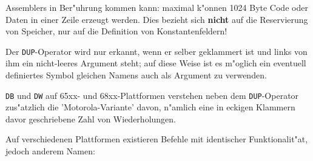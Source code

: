 \documentclass[12pt,a4paper,twoside]{report}
\newcommand{\bb}[1]{{\bf #1}}
\newcommand{\tty}[1]{{\tt #1}}
\begin{document}
Assemblers in Ber"uhrung kommen kann: maximal k"onnen 1024 Byte Code
oder Daten in einer Zeile erzeugt werden.  Dies bezieht sich \bb{nicht}
auf die Reservierung von Speicher, nur auf die Definition von
Konstantenfeldern!
\par
Der \tty{DUP}-Operator wird nur erkannt, wenn er selber geklammert ist
und links von ihm ein nicht-leeres Argument steht; auf diese Weise ist es
m"oglich ein eventuell definiertes Symbol gleichen Namens auch als Argument
zu verwenden.
\par
\tty{DB} und \tty{DW} auf 65xx- und 68xx-Plattformen verstehen neben
dem \tty{DUP}-Operator zus"atzlich die 'Motorola-Variante' davon,
n"amlich eine in eckigen Klammern davor geschriebene Zahl von
Wiederholungen.
\par
Auf verschiedenen Plattformen existieren Befehle mit identischer
Funktionalit"at, jedoch anderem Namen:
\end{document}

